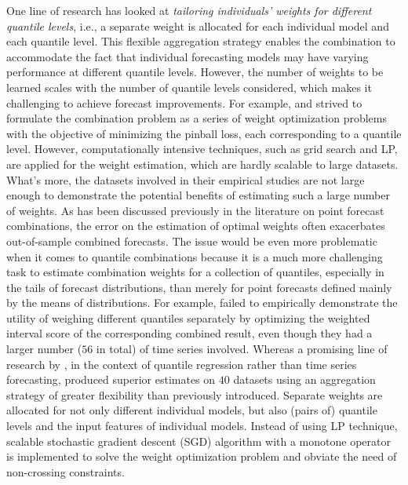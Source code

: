 \documentclass[11pt]{article}
\begin{document}
One line of research has looked at \textit{tailoring individuals' weights for different quantile levels}, i.e., a separate weight is allocated for each individual model and each quantile level. This flexible aggregation strategy enables the combination to accommodate the fact that individual forecasting models may have varying performance at different quantile levels. However, the number of weights to be learned scales with the number of quantile levels considered, which makes it challenging to achieve forecast improvements. For example, \citet{Wang2019-lx} and \citet{Browell2020-pa} strived to formulate the combination problem as a series of weight optimization problems with the objective of minimizing the pinball loss, each corresponding to a quantile level. However, computationally intensive techniques, such as grid search and LP, are applied for the weight estimation, which are hardly scalable to large datasets. What's more, the datasets involved in their empirical studies are not large enough to demonstrate the potential benefits of estimating such a large number of weights. As has been discussed previously in the literature on point forecast combinations, the error on the estimation of optimal weights often exacerbates out-of-sample combined forecasts. The issue would be even more problematic when it comes to quantile combinations because it is a much more challenging task to estimate combination weights for a collection of quantiles, especially in the tails of forecast distributions, than merely for point forecasts defined mainly by the means of distributions. For example, \citet{Brooks2020-sg} failed to empirically demonstrate the utility of weighing different quantiles separately by optimizing the weighted interval score \citep[WIS,][]{Bracher2021-hx} of the corresponding combined result, even though they had a larger number ($56$ in total) of time series involved. Whereas a promising line of research by \citet{Kim2021-wa}, in the context of quantile regression rather than time series forecasting, produced superior estimates on $40$ datasets using an aggregation strategy of greater flexibility than previously introduced. Separate weights are allocated for not only different individual models, but also (pairs of) quantile levels and the input features of individual models. Instead of using LP technique, scalable stochastic gradient descent (SGD) algorithm with a monotone operator is implemented to solve the weight optimization problem and obviate the need of non-crossing constraints.
\end{document}
